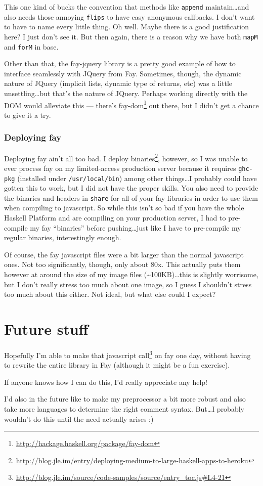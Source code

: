 \documentclass[]{article}
\renewcommand{\href}[2]{#2\footnote{\url{#1}}}
\begin{document}
This one kind of bucks the convention that methods like \texttt{append}
maintain\ldots{}and also needs those annoying \texttt{flips} to have
easy anonymous callbacks. I don't want to have to name every little
thing. Oh well. Maybe there is a good justification here? I just don't
see it. But then again, there is a reason why we have both \texttt{mapM}
and \texttt{forM} in base.

Other than that, the fay-jquery library is a pretty good example of how
to interface seamlessly with JQuery from Fay. Sometimes, though, the
dynamic nature of JQuery (implicit lists, dynamic type of returns, etc)
was a little unsettling\ldots{}but that's the nature of JQuery. Perhaps
working directly with the DOM would alleviate this --- there's
\href{http://hackage.haskell.org/package/fay-dom}{fay-dom} out there,
but I didn't get a chance to give it a try.

\subsubsection{Deploying fay}\label{deploying-fay}

Deploying fay ain't all too bad. I
\href{http://blog.jle.im/entry/deploying-medium-to-large-haskell-apps-to-heroku}{deploy
binaries}, however, so I was unable to ever process fay on my
limited-access production server because it requires \texttt{ghc-pkg}
(installed under \texttt{/usr/local/bin}) among other things\ldots{}I
probably could have gotten this to work, but I did not have the proper
skills. You also need to provide the binaries and headers in
\texttt{share} for all of your fay libraries in order to use them when
compiling to javascript. So while this isn't so bad if you have the
whole Haskell Platform and are compiling on your production server, I
had to pre-compile my fay ``binaries'' before pushing\ldots{}just like I
have to pre-compile my regular binaries, interestingly enough.

Of course, the fay javascript files were a bit larger than the normal
javascript ones. Not too significantly, though, only about 80x. This
actually puts them however at around the size of my image files
(\textasciitilde{}100KB)\ldots{}this is slightly worrisome, but I don't
really stress too much about one image, so I guess I shouldn't stress
too much about this either. Not ideal, but what else could I expect?

\section{Future stuff}\label{future-stuff}

Hopefully I'm able to make
\href{http://blog.jle.im/source/code-samples/source/entry_toc.js\#L4-21}{that
javascript call} on fay one day, without having to rewrite the entire
library in Fay (although it might be a fun exercise).

If anyone knows how I can do this, I'd really appreciate any help!

I'd also in the future like to make my preprocessor a bit more robust
and also take more languages to determine the right comment syntax.
But\ldots{}I probably wouldn't do this until the need actually arises :)
\end{document}
